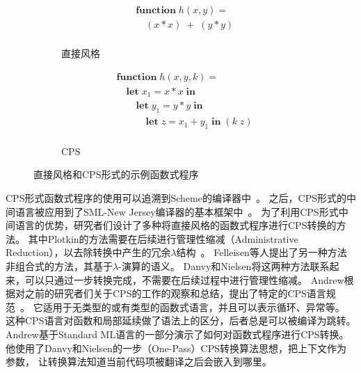 \begin{figure}
    \centering
    \begin{subfigure}[b]{0.4\textwidth}
        \flushright
     \begin{equation}
        \nonumber
        \begin{aligned}
        &  \mathbf{function}\; h(x,y) = \\
        & \quad (x*x)\; +\; (y*y) \\
        \end{aligned}
    \end{equation}
    \caption{直接风格}
        \label{fig:ori2}
    \end{subfigure}
    \begin{subfigure}[b]{0.5\textwidth}
        \flushleft
        \begin{equation}
            \nonumber
            \begin{aligned}
            & \mathbf{function}\; h(x,y,k)= \\
            & \quad \mathbf{let}\; x_1=x*x\; \mathbf{in} \\
            & \quad\quad \mathbf{let}\; y_1=y*y\; \mathbf{in} \\
            & \quad\quad\quad \mathbf{let}\; z=x_1+y_1\; \mathbf{in}\; (k\; z) \\
            \end{aligned}
        \end{equation}
        \caption{CPS}
        \label{fig:cps2}
    \end{subfigure}
    \caption{直接风格和CPS形式的示例函数式程序}\label{cpsdirect}
  \end{figure}

CPS形式函数式程序的使用可以追溯到Scheme的编译器中~\cite{steele1978rabbit}。
之后，CPS形式的中间语言被应用到了SML-New Jersey编译器的基本框架中~\cite{shao1995type}。
为了利用CPS形式中间语言的优势，研究者们设计了多种将直接风格的函数式程序进行CPS转换的方法。
其中Plotkin的方法需要在后续进行管理性缩减（Administrative Reduction），以去除转换中产生的冗余$\lambda$结构~\cite{plotkin1977lcf}。
Felleisen等人提出了另一种方法非组合式的方法，其基于$\lambda$-演算的语义。
Danvy和Nielsen将这两种方法联系起来，可以只通过一步转换完成，不需要在后续过程中进行管理性缩减\cite{danvy2007one}。
Andrew根据对之前的研究者们关于CPS的工作的观察和总结，提出了特定的CPS语言规范~\cite{kennedy2007compiling}。
它适用于无类型的或有类型的函数式语言，并且可以表示循环、异常等。
这种CPS语言对函数和局部延续做了语法上的区分，后者总是可以被编译为跳转。
Andrew基于Standard ML语言的一部分演示了如何对函数式程序进行CPS转换。
他使用了Danvy和Nielsen的一步（One-Pass）CPS转换算法思想，把上下文作为参数，
让转换算法知道当前代码项被翻译之后会嵌入到哪里。

